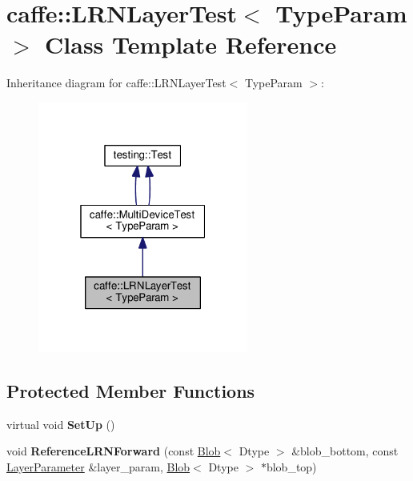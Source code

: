 \hypertarget{classcaffe_1_1_l_r_n_layer_test}{}\section{caffe\+:\+:L\+R\+N\+Layer\+Test$<$ Type\+Param $>$ Class Template Reference}
\label{classcaffe_1_1_l_r_n_layer_test}


Inheritance diagram for caffe\+:\+:L\+R\+N\+Layer\+Test$<$ Type\+Param $>$\+:
\nopagebreak
\begin{figure}[H]
\begin{center}
\leavevmode
\includegraphics[width=196pt]{classcaffe_1_1_l_r_n_layer_test__inherit__graph}
\end{center}
\end{figure}
\subsection*{Protected Member Functions}
\begin{DoxyCompactItemize}
\item 
\mbox{\label{classcaffe_1_1_l_r_n_layer_test_aa0e2bc484c0a8a947aba51e5ee4a2ac4}} 
virtual void {\bfseries Set\+Up} ()
\item 
\mbox{\label{classcaffe_1_1_l_r_n_layer_test_ae6d697d2f840c9a843b5ae73a154b442}} 
void {\bfseries Reference\+L\+R\+N\+Forward} (const \mbox{\hyperlink{classcaffe_1_1_blob}{Blob}}$<$ Dtype $>$ \&blob\+\_\+bottom, const \mbox{\hyperlink{classcaffe_1_1_layer_parameter}{Layer\+Parameter}} \&layer\+\_\+param, \mbox{\hyperlink{classcaffe_1_1_blob}{Blob}}$<$ Dtype $>$ $\ast$blob\+\_\+top)
\end{DoxyCompactItemize}

